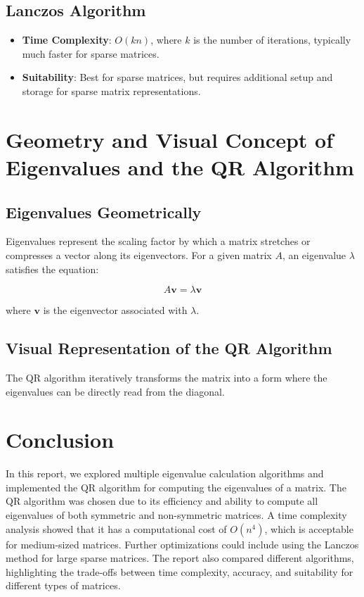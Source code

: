 \documentclass[12pt]{article}
\begin{document}
\subsection{Lanczos Algorithm}
\begin{itemize}
    \item \textbf{Time Complexity}: \( O(kn) \), where \( k \) is the number of iterations, typically much faster for sparse matrices.
    \item \textbf{Suitability}: Best for sparse matrices, but requires additional setup and storage for sparse matrix representations.
\end{itemize}

\section{Geometry and Visual Concept of Eigenvalues and the QR Algorithm}

\subsection{Eigenvalues Geometrically}
Eigenvalues represent the scaling factor by which a matrix stretches or compresses a vector along its eigenvectors. For a given matrix \( A \), an eigenvalue \( \lambda \) satisfies the equation:

\[
A\mathbf{v} = \lambda\mathbf{v}
\]

where \( \mathbf{v} \) is the eigenvector associated with \( \lambda \).

\subsection{Visual Representation of the QR Algorithm}
The QR algorithm iteratively transforms the matrix into a form where the eigenvalues can be directly read from the diagonal. 
\section{Conclusion}
In this report, we explored multiple eigenvalue calculation algorithms and implemented the QR algorithm for computing the eigenvalues of a matrix. The QR algorithm was chosen due to its efficiency and ability to compute all eigenvalues of both symmetric and non-symmetric matrices. A time complexity analysis showed that it has a computational cost of \( O(n^4) \), which is acceptable for medium-sized matrices. Further optimizations could include using the Lanczos method for large sparse matrices. The report also compared different algorithms, highlighting the trade-offs between time complexity, accuracy, and suitability for different types of matrices.
\end{document}
